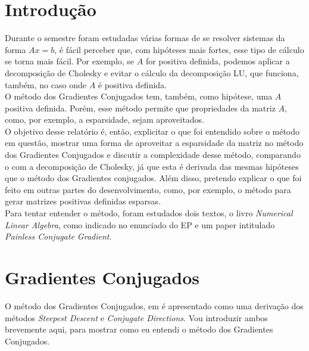\documentclass[
10pt, %
a4paper, %
oneside, %
headinclude,footinclude, %
BCOR5mm, %
]{scrartcl}
\begin{document}

\newpage %


\section{Introdução}
Durante o semestre foram estudadas várias formas de se resolver sistemas da forma $Ax = b$, é fácil perceber que, com hipóteses mais fortes, esse tipo de cálculo se torna mais fácil. Por exemplo, se $A$ for positiva definida, podemos aplicar a decomposição de Cholesky e evitar o cálculo da decomposição LU, que funciona, também, no caso onde $A$ é positiva definida. \\
O método dos Gradientes Conjugados tem, também, como hipótese, uma $A$ positiva definida. Porém, esse método permite que propriedades da matriz $A$, como, por exemplo, a esparsidade, sejam aproveitados. \\
O objetivo desse relatório é, então, explicitar o que foi entendido sobre o método em questão, mostrar uma forma de aproveitar a esparsidade da matriz no método dos Gradientes Conjugados e discutir a complexidade desse método, comparando o com a decomposição de Cholesky, já que esta é derivada das mesmas hipóteses que o método dos Gradientes conjugados. Além disso, pretendo explicar o que foi feito em outras partes do desenvolvimento, como, por exemplo, o método para gerar matrizes positivas definidas esparsas. \\
Para tentar entender o método, foram estudados dois textos, o livro \textit{Numerical Linear Algebra}\cite{trefethen1997numerical}, como indicado no enunciado do EP e um paper intitulado \textit{Painless Conjugate Gradient}\cite{shewchuk1994introduction}.
 

\section{Gradientes Conjugados}
O método dos Gradientes Conjugados, em \cite{shewchuk1994introduction} é apresentado como uma derivação dos métodos \textit{Steepest Descent} e \textit{Conjugate Directions}. Vou introduzir ambos brevemente aqui, para mostrar como eu entendi o método dos Gradientes Conjugados.
\end{document}
